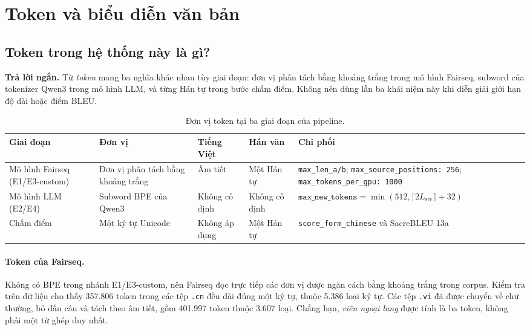 \documentclass[11pt]{article}
\newcommand{\quickanswer}[1]{%
  \par\medskip
  \noindent\colorbox{qasoft}{%
    \parbox{\dimexpr\linewidth-2\fboxsep\relax}{%
      \textcolor{qaaccent}{\textbf{Trả lời ngắn.}} #1}}
  \par\medskip
}
\begin{document}
\section{Token và biểu diễn văn bản}

\subsection{Token trong hệ thống này là gì?}

\quickanswer{Từ \emph{token} mang ba nghĩa khác nhau tùy giai đoạn: đơn vị phân
tách bằng khoảng trắng trong mô hình Fairseq, subword của tokenizer Qwen3
trong mô hình LLM, và từng Hán tự trong bước chấm điểm. Không nên dùng lẫn ba
khái niệm này khi diễn giải giới hạn độ dài hoặc điểm BLEU.}

\begin{table}[H]
  \centering
  \scriptsize
  \caption{Đơn vị token tại ba giai đoạn của pipeline.}
  \label{tab:qa-token-stages}
  \begin{tabularx}{\linewidth}{
    @{}
    >{\raggedright\arraybackslash}p{2.45cm}
    >{\raggedright\arraybackslash}p{3.05cm}
    >{\raggedright\arraybackslash}p{1.75cm}
    >{\raggedright\arraybackslash}p{1.9cm}
    >{\raggedright\arraybackslash}X
    @{}}
    \toprule
    Giai đoạn & Đơn vị & Tiếng Việt & Hán văn & Chi phối \\
    \midrule
    Mô hình Fairseq (E1/E3-custom)
      & Đơn vị phân tách bằng khoảng trắng
      & Âm tiết
      & Một Hán tự
      & \texttt{max\_len\_a/b}; \texttt{max\_source\_positions: 256};
        \texttt{max\_tokens\_per\_gpu: 1000} \\
    Mô hình LLM (E2/E4)
      & Subword BPE của Qwen3
      & Không cố định
      & Không cố định
      & $\texttt{max\_new\_tokens}
        =\min(512,\lceil2L_{\mathrm{src}}\rceil+32)$ \\
    Chấm điểm
      & Một ký tự Unicode
      & Không áp dụng
      & Một Hán tự
      & \texttt{score\_form\_chinese} và SacreBLEU 13a \\
    \bottomrule
  \end{tabularx}
\end{table}

\paragraph{Token của Fairseq.}
Không có BPE trong nhánh E1/E3-custom, nên Fairseq đọc trực tiếp các đơn vị
được ngăn cách bằng khoảng trắng trong corpus. Kiểm tra trên dữ liệu cho thấy
357.806 token trong các tệp \texttt{.cn} đều dài đúng một ký tự, thuộc 5.386
loại ký tự. Các tệp \texttt{.vi} đã được chuyển về chữ thường, bỏ dấu câu và
tách theo âm tiết, gồm 401.997 token thuộc 3.607 loại. Chẳng hạn,
\emph{viên ngoại lang} được tính là ba token, không phải một từ ghép duy nhất.
\end{document}
